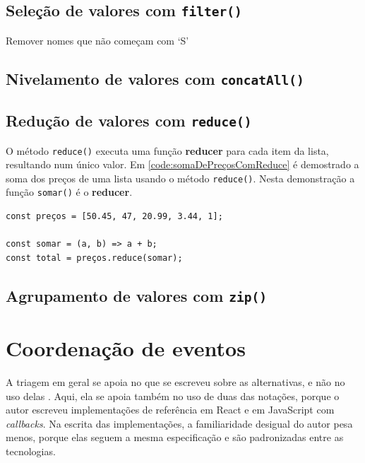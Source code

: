 \subsection{Seleção de valores com \texttt{filter()}}
\label{sec:selecao-de-valores-com-filter}
Remover nomes que não começam com ‘S’
\subsection{Nivelamento de valores com \texttt{concatAll()}}
\label{sec:nivelamento-de-valores-com-concatall}
\subsection{Redução de valores com \texttt{reduce()}}
\label{sec:reducao-de-valores-com-reduce}

O método \texttt{reduce()} executa uma função \textbf{reducer} para cada item da
lista, resultando num único valor. Em \ref{code:somaDePreçosComReduce} é
demostrado a soma dos preços de uma lista usando o método \texttt{reduce()}.
Nesta demonstração a função \texttt{somar()} é o \textbf{reducer}.

\begin{listing}[htbp]
\caption{\label{code:somaDePreçosComReduce}Soma dos preços de uma lista com o método \texttt{reduce()}.}
\begin{verbatim}
const preços = [50.45, 47, 20.99, 3.44, 1];

const somar = (a, b) => a + b;
const total = preços.reduce(somar);
\end{verbatim}
\end{listing}
\subsection{Agrupamento de valores com \texttt{zip()}}
\label{sec:agrupamento-de-valores-com-zip}
\section{Coordenação de eventos}
\label{sec:coordenacao-de-eventos}
A triagem em geral se apoia no que se escreveu sobre as alternativas, e não
no uso delas \cite[p. 15]{kitchenham1996}.
Aqui, ela se apoia também no uso de duas das notações, porque o autor
escreveu implementações de referência em React e em JavaScript com
\emph{callbacks}.
Na escrita das implementações, a familiaridade desigual do autor pesa
menos, porque elas seguem a mesma especificação e são padronizadas entre
as tecnologias.

